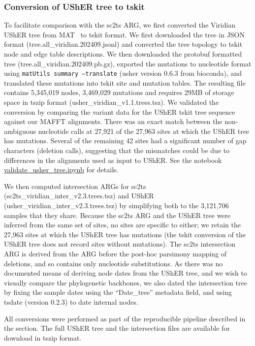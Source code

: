 \documentclass[12pt]{article}
\begin{document}
\subsubsection*{Conversion of UShER tree to tskit}
To facilitate comparison with the sc2ts ARG, we first converted the Viridian
UShER tree from MAT~\cite{McBroome2021} to tskit format.
We first downloaded the tree in JSON format (tree.all\_viridian.202409.jsonl)
and converted the tree topology to tskit node and edge table
descriptions. We then downloaded the protobuf formatted
tree (tree.all\_viridian.202409.pb.gz), exported the mutations to
nucleotide format using \texttt{matUtils summary --translate}
(usher version 0.6.3 from bioconda), and translated
these mutations into tskit site and mutation tables.
The resulting file
 contains 5,345,019 nodes, 3,469,029
mutations and requires 29MB of storage space in tszip format (usher\_viridian\_v1.1.trees.tsz).
We validated the conversion by comparing the
variant data for the UShER tskit tree sequence against our MAFFT alignments.
There was an exact match between the non-ambiguous nucleotide calls
at 27,921 of the 27,963 sites at which the UShER tree has mutations.
Several of the remaining 42 sites had a significant
number of gap characters (deletion calls), suggesting that the mismatches
could be due to differences in the alignments used as input to UShER.
See the notebook
\href{https://github.com/jeromekelleher/sc2ts-paper/blob/main/notebooks/validate\_usher\_tree.ipynb}{validate\_usher\_tree.ipynb}
for details.

We then computed intersection ARGs for
sc2ts (sc2ts\_viridian\_inter\_v2.3.trees.tsz) and
UShER (usher\_viridian\_inter\_v2.3.trees.tsz)
by simplifying \cite{Kelleher2018efficient,Wong2024}
both to the 3,121,706 samples that they share.
Because the sc2ts ARG and the UShER tree were inferred from
the same set of sites, no sites are specific to either;
we retain the 27,963 sites at which the UShER tree has mutations
(the tskit conversion of the UShER tree does not record sites without mutations).
The sc2ts intersection ARG is derived from the ARG before the post-hoc
parsimony mapping of deletions, and so
contains only nucleotide substitutions.
As there was no documented means of deriving node dates from
the UShER tree, and we wish to visually compare
the phylogenetic backbones,
we also dated the intersection tree by fixing
the sample dates using the ``Date\_tree'' metadata field,
and using tsdate (version 0.2.3) to date internal nodes.

All conversions were performed as part of the reproducible
pipeline described in the  section.
The full UShER tree and the intersection files are available for download
in tszip format. %
\end{document}
